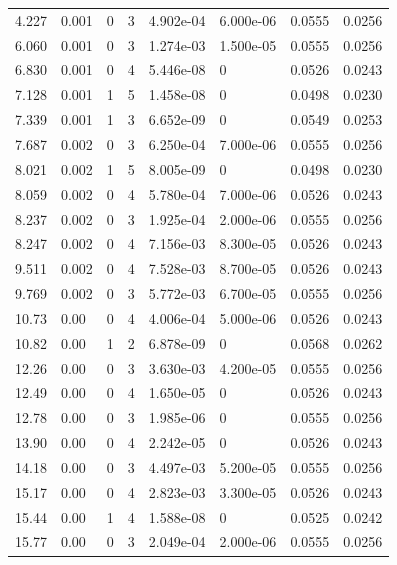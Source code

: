 \documentclass[preview]{standalone}
\begin{document}
{{\begin{tabular}{L{1.2cm}C{1.2cm} C{0.3cm}C{0.5cm} C{1.4cm}C{1.4cm} C{1.4cm}C{1.4cm}}
  4.227  &  0.001  & 0     &  3 &  4.902e-04  & 6.000e-06  & 0.0555 &  0.0256   \\ 
  6.060  &  0.001  & 0     &  3 &  1.274e-03  & 1.500e-05  & 0.0555 &  0.0256   \\ 
  6.830  &  0.001  & 0     &  4 &  5.446e-08  & 0  & 0.0526 &  0.0243   \\ 
  7.128  &  0.001  & 1     &  5 &  1.458e-08  & 0  & 0.0498 &  0.0230   \\ 
  7.339  &  0.001  & 1     &  3 &  6.652e-09  & 0  & 0.0549 &  0.0253   \\ 
  7.687  &  0.002  & 0     &  3 &  6.250e-04  & 7.000e-06  & 0.0555 &  0.0256   \\ 
  8.021  &  0.002  & 1     &  5 &  8.005e-09  & 0  & 0.0498 &  0.0230   \\ 
  8.059  &  0.002  & 0     &  4 &  5.780e-04  & 7.000e-06  & 0.0526 &  0.0243   \\ 
  8.237  &  0.002  & 0     &  3 &  1.925e-04  & 2.000e-06  & 0.0555 &  0.0256   \\ 
  8.247  &  0.002  & 0     &  4 &  7.156e-03  & 8.300e-05  & 0.0526 &  0.0243   \\ 
  9.511  &  0.002  & 0     &  4 &  7.528e-03  & 8.700e-05  & 0.0526 &  0.0243   \\ 
  9.769  &  0.002  & 0     &  3 &  5.772e-03  & 6.700e-05  & 0.0555 &  0.0256   \\ 
  10.73  &  0.00  & 0     &  4 &  4.006e-04  & 5.000e-06  & 0.0526 &  0.0243   \\ 
  10.82  &  0.00  & 1     &  2 &  6.878e-09  & 0  & 0.0568 &  0.0262   \\ 
  12.26  &  0.00  & 0     &  3 &  3.630e-03  & 4.200e-05  & 0.0555 &  0.0256   \\ 
  12.49  &  0.00  & 0     &  4 &  1.650e-05  & 0  & 0.0526 &  0.0243   \\ 
  12.78  &  0.00  & 0     &  3 &  1.985e-06  & 0  & 0.0555 &  0.0256   \\ 
  13.90  &  0.00  & 0     &  4 &  2.242e-05  & 0  & 0.0526 &  0.0243   \\ 
  14.18  &  0.00  & 0     &  3 &  4.497e-03  & 5.200e-05  & 0.0555 &  0.0256   \\ 
  15.17  &  0.00  & 0     &  4 &  2.823e-03  & 3.300e-05  & 0.0526 &  0.0243   \\ 
  15.44  &  0.00  & 1     &  4 &  1.588e-08  & 0  & 0.0525 &  0.0242   \\ 
  15.77  &  0.00  & 0     &  3 &  2.049e-04  & 2.000e-06  & 0.0555 &  0.0256   \\ 

\end{tabular}}}
\end{document}
